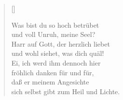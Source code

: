\begin{center}
\settowidth{\versewidth}{Der, vor dem die Welt erschrickt,}
\begin{verse}[\versewidth]



 Was bist du so hoch betrübet\\
und voll Unruh, meine Seel?\\
Harr auf Gott, der herzlich liebet\\
und wohl siehet, was dich quäl!\\
Ei, ich werd ihm dennoch hier\\
fröhlich danken für und für,\\
daß er meinem Angesichte\\
sich selbst gibt zum Heil und Lichte.
  
\end{verse}
\end{center}


